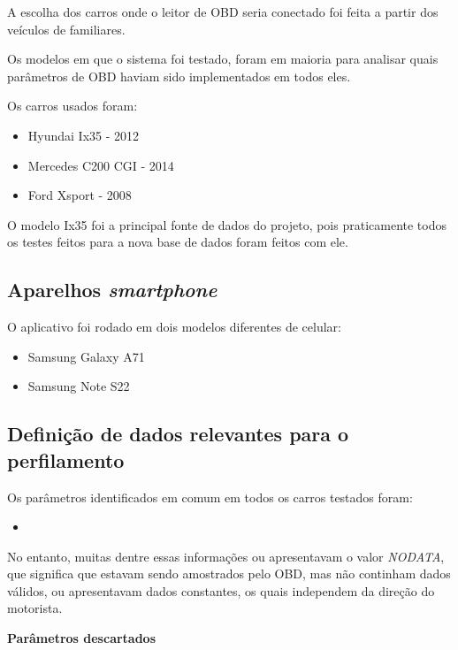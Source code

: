     A escolha dos carros onde o leitor de OBD seria conectado foi feita a partir dos veículos de familiares.

    Os modelos em que o sistema foi testado, foram em maioria para analisar quais parâmetros de OBD haviam sido implementados em todos eles.

    Os carros usados foram:

    \begin{itemize}
        \item Hyundai Ix35 - 2012
        \item Mercedes C200 CGI - 2014
        \item Ford Xsport - 2008
    \end{itemize}

    

    O modelo Ix35 foi a principal fonte de dados do projeto, pois praticamente todos os testes feitos para a nova base de dados foram feitos com ele.

    \subsection{Aparelhos \textit{smartphone}}

    O aplicativo foi rodado em dois modelos diferentes de celular:
    \begin{itemize}
        \item Samsung Galaxy A71
        \item Samsung Note S22
    \end{itemize}

\subsection{Definição de dados relevantes para o perfilamento}

    Os parâmetros identificados em comum em todos os carros testados foram:

    \begin{itemize}
        \item
    \end{itemize}

    No entanto, muitas dentre essas informações ou apresentavam o valor \textit{NODATA}, que significa que estavam sendo amostrados pelo OBD, mas não continham dados válidos, ou apresentavam dados constantes, os quais independem da direção do motorista.

    \textbf{Parâmetros descartados}
    
